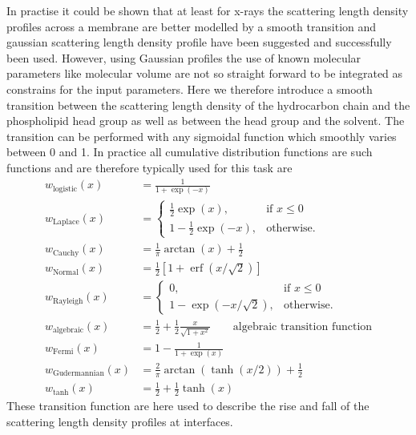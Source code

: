 In practise it could be shown \cite{Pabst2002,Brzustowicz2005} that at least for x-rays the scattering length density profiles across a membrane are better modelled by a smooth transition and gaussian scattering length density profile have been suggested and successfully been used. However, using Gaussian profiles the use of known molecular parameters like molecular volume are not so straight forward to be integrated as constrains for the input parameters.
Here we therefore introduce a smooth transition between the scattering length density of the hydrocarbon chain and the phospholipid head group as well as between the head group and the solvent. The transition can be performed with any sigmoidal function which smoothly varies between 0 and 1. In practice all cumulative distribution functions are such functions and are therefore typically used for this task are
\begin{align}
  w_\mathrm{logistic}(x) &=\frac{1}{1+\exp(-x)} \\
  w_\mathrm{Laplace}(x) &= \begin{cases}
                             \frac12 \exp(x), & \mbox{if } x\leq 0 \\
                             1-\frac12 \exp(-x), & \mbox{otherwise}.
                           \end{cases}  \\
  w_\mathrm{Cauchy}(x) &= \frac{1}{\pi}\arctan(x)+\frac12  \\
  w_\mathrm{Normal}(x) &=\frac12 \left[1+\operatorname{erf}(x/\sqrt{2})\right]  \\
  w_\mathrm{Rayleigh}(x) &= \begin{cases}
                             0, & \mbox{if } x\leq 0 \\
                             1-\exp\left(-x/\sqrt{2}\right), & \mbox{otherwise}.
                           \end{cases} \\
  w_\mathrm{algebraic}(x) &=\frac12 + \frac12 \frac{x}{\sqrt{1+x^2}} \qquad\mbox{algebraic transition function}\\
  w_\mathrm{Fermi}(x) &=1-\frac{1}{1+\exp(x)} \\
  w_\mathrm{Gudermannian}(x) &=\frac{2}{\pi}\arctan\left(\tanh(x/2)\right)+\frac12\\
  w_\mathrm{tanh}(x) &=\frac12 + \frac12 \tanh(x)
\end{align}
These transition function are here used to describe the rise and fall of the scattering length density profiles at interfaces.
